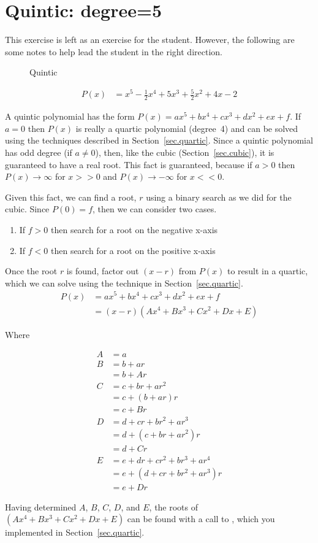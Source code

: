 \section{Quintic: degree=5}
\label{sec.quintic}

This exercise is left as an exercise for the student.  However, the following are some
notes to help lead the student in the right direction.

\begin{figure}
\centering

\caption{Quintic}
\label{fig.quintic}
\end{figure}

\begin{align*}
  P(x) &= x^5 - \frac{1}{2} x^4 + 5 x^3 + \frac{5}{2} x^2 + 4 x - 2
\end{align*}


A quintic polynomial has the form $P(x) = a x^5 + b x^4 + c x^3 + d x^2 + e x + f$.
If $a=0$ then $P(x)$ is really
a quartic polynomial (degree~4) and can be solved using the techniques described in Section~\ref{sec.quartic}.
Since a quintic polynomial has odd degree (if $a\neq 0$),
then, like the cubic (Section~\ref{sec.cubic}), it is guaranteed to have a real root.  This fact
is guaranteed, because if
$a>0$ then $P(x)\to \infty$ for $x>>0$ and $P(x)\to -\infty$ for $x<<0$.

Given this fact, we can find a root, $r$ using a binary search as we did for the cubic.
Since $P(0) = f$, then we can consider two cases.
\begin{enumerate}
\item If $f>0$ then search for a root on the negative x-axis
\item If $f<0$ then search for a root on the positive x-axis
\end{enumerate}

Once the root $r$ is found, factor out $(x-r)$ from $P(x)$ to result in a quartic, which we can solve using
the technique in Section~\ref{sec.quartic}.
\begin{align*}
  P(x) &= a x^5 + b x^4 + c x^3 + d x^2 + e x + f\\
  &= (x - r) (Ax^4 + B x^3 + C x^2 + D x + E)
\end{align*}

Where

\begin{align*}
  A &= a\\
  B &= b + a r\\
   &= b + A r\\
  C &= c + b r + a r^2\\
  &= c + (b + a r)r\\
  &= c + B r\\
  D &= d + c r + b r^2 + a r^3\\
  &= d + ( c + b r + a r^2)r\\
  &= d + C r\\
  E &= e + d r + c r^2 + b r^3 + a r^4\\
  &= e + ( d + c r + b r^2 + a r^3)r\\
  &= e + D r
\end{align*}


Having determined $A$, $B$, $C$, $D$, and $E$, the roots of $(A x^4 + B x^3 + C x^2 + D x + E)$ can be
found with a call to , which you implemented in Section~\ref{sec.quartic}.



